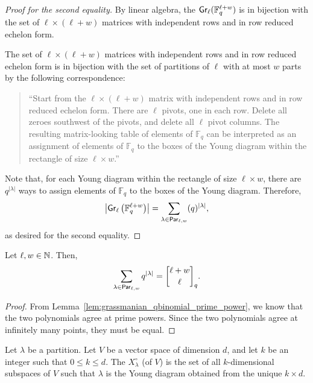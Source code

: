 \begin{proof}[Proof for the second equality]
    By linear algebra, the \(\operatorname{\mathsf{Gr}}_\ell(\mathbb{F}_q^{\ell + w})\) is in bijection with the set of \(\ell \times (\ell + w)\) matrices with independent rows and in row reduced echelon form.

    The set of \(\ell \times (\ell + w)\) matrices with independent rows and in row reduced echelon form is in bijection with the set of partitions of \(\ell\) with at most \(w\) parts by the following correspondence:
    \begin{quote}
        ``Start from the \(\ell \times (\ell + w)\) matrix with independent rows and in row reduced echelon form.
        There are \(\ell\) pivots, one in each row.
        Delete all zeroes southwest of the pivots, and delete all \(\ell\) pivot columns.
        The resulting matrix-looking table of elements of \(\mathbb{F}_q\) can be interpreted as an assignment of elements of \(\mathbb{F}_q\) to the boxes of the Young diagram within the rectangle of size \(\ell \times w\).''
    \end{quote}

    Note that, for each Young diagram within the rectangle of size \(\ell \times w\), there are \(q^{|\lambda|}\) ways to assign elements of \(\mathbb{F}_q\) to the boxes of the Young diagram.
    Therefore,
    \[
        \left|
            \operatorname{\mathsf{Gr}}_\ell\left(\mathbb{F}_{q}^{\ell + w} \right)
        \right|
        = \sum_{\lambda \in \operatorname{\mathsf{Par}}_{\ell, w}} (q)^{|\lambda|},
    \]
    as desired for the second equality.
\end{proof}

\begin{theorem}
    Let \(\ell, w \in \mathbb{N}\).
    Then,
    \[
        \sum_{\lambda \in \Par_{\ell, w}} q^{|\lambda|}
        = \qbinom{\ell + w}{\ell}.
    \]
\end{theorem}

\begin{proof}
    From Lemma~\ref{lem:grassmanian_qbinomial_prime_power},
    we know that the two polynomials agree at prime powers.
    Since the two polynomials agree at infinitely many points,
    they must be equal.
\end{proof}

\begin{definition}
    Let \(\lambda\) be a partition.
    Let \(V\) be a vector space of dimension \(d\), and let \(k\) be an integer such that \(0 \leq k \leq d\).
    The  \(X^\circ_\lambda\) (of \(V\)) is the set of all \(k\)-dimensional subspaces of \(V\) such that \(\lambda\) is the Young diagram obtained from the unique \(k \times d\).
\end{definition}